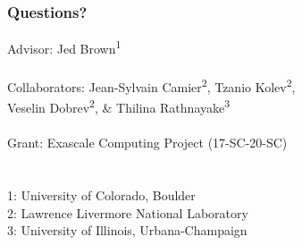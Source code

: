 \documentclass{beamer}
\begin{document}
\begin{frame}
\begin{center}
\frametitle{Questions?}

{\flushleft

Advisor: \hspace{8mm} Jed Brown\textsuperscript{1}\\

~\\

Collaborators: Jean-Sylvain Camier\textsuperscript{2}, Tzanio Kolev\textsuperscript{2},\\
\hspace{23mm} Veselin Dobrev\textsuperscript{2}, \& Thilina Rathnayake\textsuperscript{3}\\

~\\

Grant: \hspace{11mm} Exascale Computing Project (17-SC-20-SC)\\

~\\

~\\

\small{1: University of Colorado, Boulder\\
2: Lawrence Livermore National Laboratory\\
3: University of Illinois, Urbana-Champaign\\}}

\end{center}
\end{frame}


\begin{frame}[noframenumbering]
\titlepage %
\end{frame}


\end{document}
